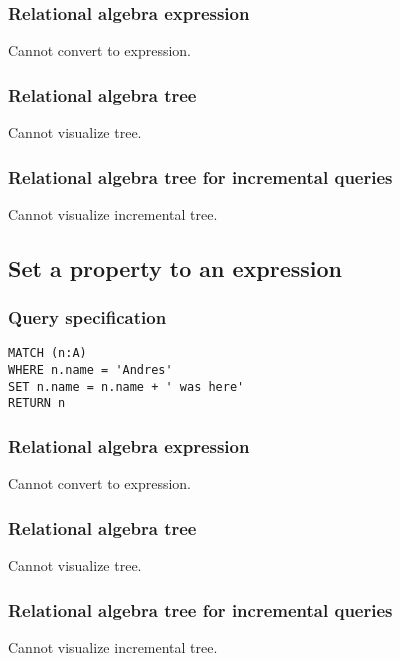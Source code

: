 \subsubsection*{Relational algebra expression}

Cannot convert to expression.

\subsubsection*{Relational algebra tree}

Cannot visualize tree.

\subsubsection*{Relational algebra tree for incremental queries}

Cannot visualize incremental tree.

\subsection{Set a property to an expression}

\subsubsection*{Query specification}

\begin{lstlisting}
MATCH (n:A)
WHERE n.name = 'Andres'
SET n.name = n.name + ' was here'
RETURN n
\end{lstlisting}

\subsubsection*{Relational algebra expression}

Cannot convert to expression.

\subsubsection*{Relational algebra tree}

Cannot visualize tree.

\subsubsection*{Relational algebra tree for incremental queries}

Cannot visualize incremental tree.

